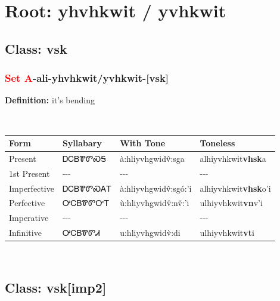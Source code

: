 \needspace{4in}
\section*{Root: yhvhkwit / yvhkwit}
\nopagebreak
{}
\needspace{3in}
\subsection*{Class: vsk}
\nopagebreak
\needspace{2in}
\subsubsection*{\textcolor{Red}{Set A}{-}ali{-}\textbf{yhvhkwit/yvhkwit}{-}[vsk]}
\nopagebreak
\textbf{Definition: } it{\textquoteright}s bending
\\[0.5em]
\begin{tabularx}{\textwidth}{l X X X}%
\toprule%
\textbf{Form}&\textbf{Syllabary}&\textbf{With Tone}&\textbf{Toneless}\\%
\midrule%
Present&ᎠᏟᏴᏈᏛᏍᎦ&à:hliyvhgwidv̂:sga&alhiyvhkwit\textbf{vhsk}a\\%
1st Present&{-}{-}{-}&{-}{-}{-}&{-}{-}{-}\\%
Imperfective&ᎠᏟᏴᏈᏛᏍᎪᎢ&à:hliyvhgwidv̂:sgó:’i&alhiyvhkwit\textbf{vhsk}o'i\\%
Perfective&ᎤᏟᏴᏈᏛᏅᎢ&ù:hliyvhgwidv̂:nv̌:’i&ulhiyvhkwit\textbf{vn}v'i\\%
Imperative&{-}{-}{-}&{-}{-}{-}&{-}{-}{-}\\%
Infinitive&ᎤᏟᏴᏈᏛᏗ&u:hliyvhgwidv̀:di&ulhiyvhkwit\textbf{vt}i\\%
\bottomrule%
\end{tabularx}
\\[1em]
\needspace{3in}
\subsection*{Class: vsk[imp2]}
\nopagebreak
\needspace{2in}
